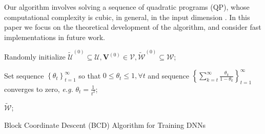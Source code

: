 \documentclass{article}
\providecommand{\SetAlgoLined}{\SetLine}
\def\eg{\emph{e.g. }}
\begin{document}
Our algorithm involves solving a sequence of quadratic programs (QP), whose computational complexity is cubic, in general, in the input dimension \cite{nesterov1994interior}. %
In this paper we focus on the theoretical development of the algorithm, and consider fast implementations in future work.%

\begin{algorithm}[t]\footnotesize
\SetAlgoLined
{}
\BlankLine
Randomly initialize $\tilde{\mathcal{U}}^{(0)}\subseteq\mathcal{U}, \mathbf{V}^{(0)}\in\mathcal{V}, \tilde{\mathcal{W}}^{(0)}\subseteq\mathcal{W}$;
        
Set sequence $\left\{\theta_t\right\}_{t=1}^{\infty}$ so that $0\leq\theta_t\leq 1, \forall t$ and sequence $\left\{\sum_{k=t}^{\infty}\frac{\theta_k}{1-\theta_k}\right\}_{t=1}^{\infty}$ converges to zero, \eg $\theta_t = \frac{1}{t^2}$;
		
		\Return $\tilde{\mathcal{W}}$;
		\caption{Block Coordinate Descent (BCD) Algorithm for Training DNNs}\label{alg:bcd}
	\end{algorithm}
    
\end{document}
